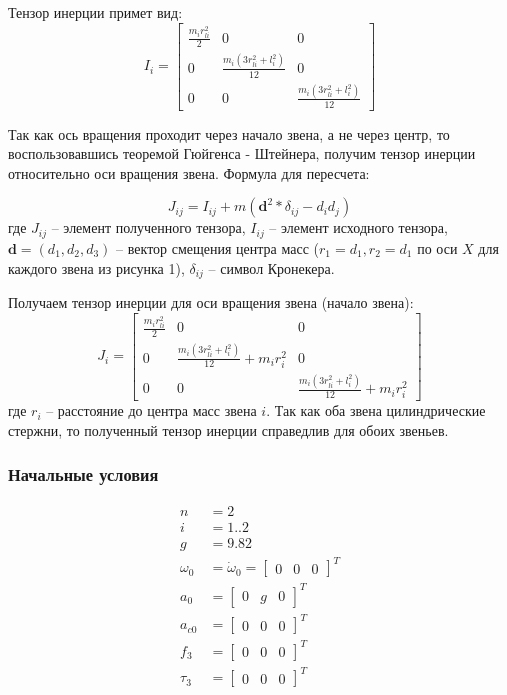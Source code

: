 \documentclass[a4paper,14pt]{extreport}
\begin{document}
Тензор инерции примет вид:
\begin{equation}
	I_i = 
	\begin{bmatrix}
	\frac{m_i r_{li}^2}{2} & 0 & 0 \\ 
	0 &    	\frac{m_i (3 r_{li}^2 + l_i^2)}{12} & 0\\
	0 & 0 & \frac{m_i (3 r_{li}^2 + l_i^2)}{12}
	\end{bmatrix}
\end{equation}

Так как ось вращения проходит через начало звена, а не через центр, то воспользовавшись теоремой Гюйгенса - Штейнера, получим тензор инерции относительно оси вращения звена. Формула для пересчета:

\begin{equation}
	J_{ij} = I_{ij} + m (\textbf{d}^2 * \delta_{ij} -d_i d_j)
\end{equation}
где $J_{ij}$ -- элемент полученного тензора, $I_{ij}$ -- элемент исходного тензора, $\textbf{d} = (d_1, d_2, d_3)$ -- вектор смещения центра масс ($r_1 = d_1, r_2 = d_1$ по оси $X$ для каждого звена из рисунка 1), $\delta_{ij}$ -- символ Кронекера.

Получаем тензор инерции для оси вращения звена (начало звена):
\begin{equation}
	J_i = 
\begin{bmatrix}
\frac{m_i r_{li}^2}{2} & 0 & 0 \\ 
0 &    \frac{m_i (3 r_{li}^2 + l_i^2)}{12} + m_i r_i^2 & 0\\
0 & 0 &\frac{m_i (3 r_{li}^2 + l_i^2)}{12} + m_i r_i^2
\end{bmatrix}
\end{equation}
где $r_i$ -- расстояние до центра масс звена $i$. Так как оба звена цилиндрические стержни, то полученный тензор инерции справедлив для обоих звеньев.

\subsubsection{Начальные условия}

\begin{align}
	n &= 2\\
	i &= 1..2\\
	g &= 9.82\\
	\omega_0 &= \dot \omega_0 =
	\begin{bmatrix}
		0&0&0
	\end{bmatrix}^T\\
	a_0 &=
	\begin{bmatrix}
0&g&0
\end{bmatrix}^T\\
	a_{c0} &=
	\begin{bmatrix}
0&0&0
\end{bmatrix}^T\\
	f_{3} &=
\begin{bmatrix}
0&0&0
\end{bmatrix}^T\\
	\tau_{3} &=
\begin{bmatrix}
0&0&0
\end{bmatrix}^T
\end{align}
\end{document}
